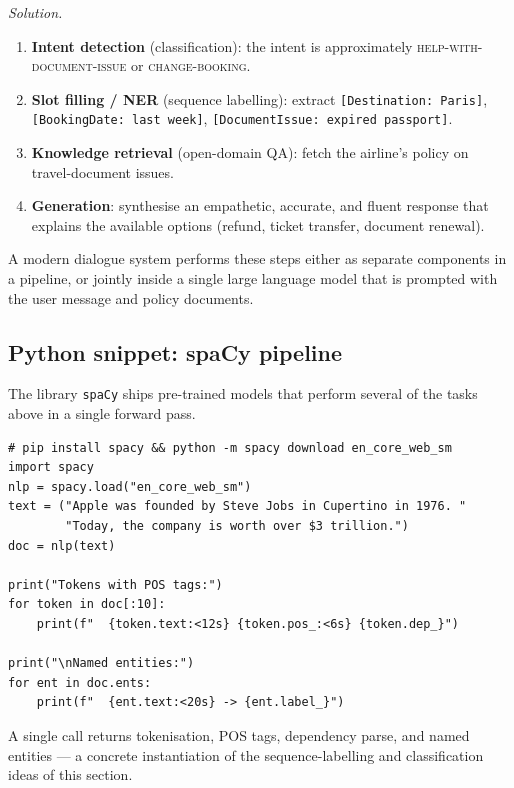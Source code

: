 \textit{Solution.}
\begin{enumerate}
    \item \textbf{Intent detection} (classification): the intent is approximately \textsc{help-with-document-issue} or \textsc{change-booking}.
    \item \textbf{Slot filling / NER} (sequence labelling): extract \texttt{[Destination: Paris]}, \texttt{[BookingDate: last week]}, \texttt{[DocumentIssue: expired passport]}.
    \item \textbf{Knowledge retrieval} (open-domain QA): fetch the airline's policy on travel-document issues.
    \item \textbf{Generation}: synthesise an empathetic, accurate, and fluent response that explains the available options (refund, ticket transfer, document renewal).
\end{enumerate}
A modern dialogue system performs these steps either as separate components in a pipeline, or jointly inside a single large language model that is prompted with the user message and policy documents.

\subsection{Python snippet: spaCy pipeline}

The library \texttt{spaCy} ships pre-trained models that perform several of the tasks above in a single forward pass.

\begin{lstlisting}
# pip install spacy && python -m spacy download en_core_web_sm
import spacy
nlp = spacy.load("en_core_web_sm")
text = ("Apple was founded by Steve Jobs in Cupertino in 1976. "
        "Today, the company is worth over $3 trillion.")
doc = nlp(text)

print("Tokens with POS tags:")
for token in doc[:10]:
    print(f"  {token.text:<12s} {token.pos_:<6s} {token.dep_}")

print("\nNamed entities:")
for ent in doc.ents:
    print(f"  {ent.text:<20s} -> {ent.label_}")
\end{lstlisting}

A single call returns tokenisation, POS tags, dependency parse, and named entities --- a concrete instantiation of the sequence-labelling and classification ideas of this section.

